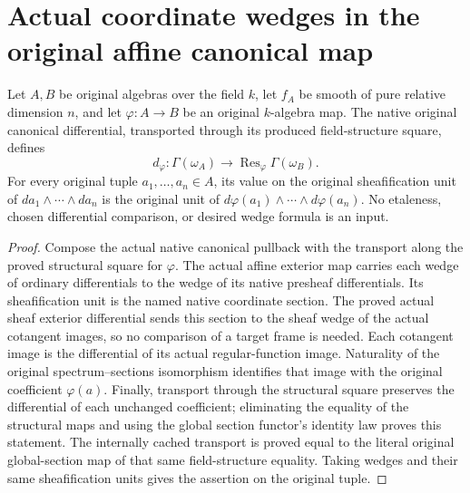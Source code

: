 \section{Actual coordinate wedges in the original affine canonical map}

\begin{lemma}
\label{lem:kn-global-trace-native-coordinate-wedge}
\leanok
Let $A,B$ be original algebras over the field $k$, let $f_A$ be smooth
of pure relative dimension $n$, and let $\varphi:A\to B$ be an original
$k$-algebra map.  The native original canonical differential, transported
through its produced field-structure square, defines
\[
 d_\varphi:\Gamma(\omega_A)\to
       \operatorname{Res}_{\varphi}\Gamma(\omega_B).
\]
For every original tuple $a_1,\ldots,a_n\in A$, its value on the original
sheafification unit of $da_1\wedge\cdots\wedge da_n$ is the original unit
of $d\varphi(a_1)\wedge\cdots\wedge d\varphi(a_n)$.
No etaleness, chosen differential comparison, or desired wedge formula
is an input.
\end{lemma}
\begin{proof}
Compose the actual native canonical pullback with the transport along the
proved structural square for $\varphi$.  The actual affine exterior map carries each wedge of ordinary
differentials to the wedge of its native presheaf differentials.  Its
sheafification unit is the named native coordinate section.  The proved
actual sheaf exterior differential sends this section to the sheaf wedge
of the actual cotangent images, so no comparison of a target frame is
needed.  Each cotangent image is the differential of its actual
regular-function image.  Naturality of the
original spectrum--sections isomorphism identifies that image with the
original coefficient $\varphi(a)$.  Finally, transport through the
structural square preserves the differential of each unchanged coefficient;
eliminating the equality of the structural maps and using the global
section functor's identity law proves this statement.  The internally
cached transport is proved equal to the literal original global-section
map of that same field-structure equality.  Taking wedges and their same sheafification units gives
the assertion on the original tuple.
\end{proof}
